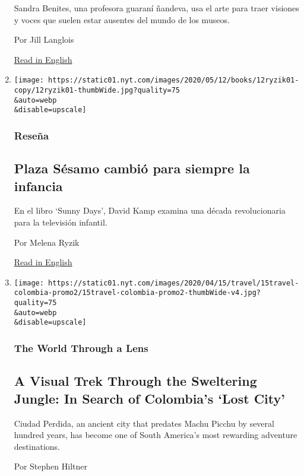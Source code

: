 \begin{enumerate}
  Sandra Benites, una profesora guaraní ñandeva, usa el arte para traer
  visiones y voces que suelen estar ausentes del mundo de los museos.

  Por Jill Langlois

  \href{https://www.nytimes.com/2020/05/22/arts/design/sandra-benites-brazil-museum-curator.html}{Read
  in English}
\item
  \href{/es/2020/05/18/espanol/cultura/resena-plaza-sesamo-sunny-days.html}{}

  \texttt{[image: https://static01.nyt.com/images/2020/05/12/books/12ryzik01-copy/12ryzik01-thumbWide.jpg?quality=75\\\&auto=webp\\\&disable=upscale]}

  \hypertarget{reseuxf1a}{%
  \subsubsection{Reseña}\label{reseuxf1a}}

  \hypertarget{plaza-suxe9samo-cambiuxf3-para-siempre-la-infancia}{%
  \subsection{Plaza Sésamo cambió para siempre la
  infancia}\label{plaza-suxe9samo-cambiuxf3-para-siempre-la-infancia}}

  En el libro `Sunny Days', David Kamp examina una década revolucionaria
  para la televisión infantil.

  Por Melena Ryzik

  \href{https://www.nytimes.com/2020/05/12/books/review/sunny-days-david-kamp.html}{Read
  in English}
\item
  \href{/2020/04/15/travel/colombia-lost-city-ciudad-perdida.html}{}

  \texttt{[image: https://static01.nyt.com/images/2020/04/15/travel/15travel-colombia-promo2/15travel-colombia-promo2-thumbWide-v4.jpg?quality=75\\\&auto=webp\\\&disable=upscale]}

  \hypertarget{the-world-through-a-lens}{%
  \subsubsection{The World Through a
  Lens}\label{the-world-through-a-lens}}

  \hypertarget{a-visual-trek-through-the-sweltering-jungle-in-search-of-colombias-lost-city}{%
  \subsection{A Visual Trek Through the Sweltering Jungle: In Search of
  Colombia's `Lost
  City'}\label{a-visual-trek-through-the-sweltering-jungle-in-search-of-colombias-lost-city}}

  Ciudad Perdida, an ancient city that predates Machu Picchu by several
  hundred years, has become one of South America's most rewarding
  adventure destinations.

  Por Stephen Hiltner
\end{enumerate}


